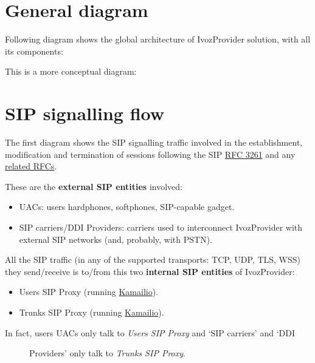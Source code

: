\documentclass[letterpaper,10pt,english]{sphinxmanual}
\begin{document}
\section{General diagram}
\label{basic_concepts/architecture/index:general-diagram}
Following diagram shows the global architecture of IvozProvider solution,
with all its components:

\noindent{}

This is a more conceptual diagram:

\noindent{}


\section{SIP signalling flow}
\label{basic_concepts/architecture/index:sip-signalling-flow}\label{basic_concepts/architecture/index:signallingflow}
The first diagram shows the SIP signalling traffic involved in the
establishment, modification and termination of sessions following the SIP
\href{https://tools.ietf.org/html/rfc3261}{RFC 3261} and any \href{https://www.packetizer.com/ipmc/sip/standards.html}{related RFCs}.

These are the \textbf{external SIP entities} involved:
\begin{itemize}
\item {} 
UACs: users hardphones, softphones, SIP-capable gadget.

\item {} 
SIP carriers/DDI Providers: carriers used to interconnect IvozProvider with external SIP
networks (and, probably, with PSTN).

\end{itemize}

All the SIP traffic (in any of the supported transports: TCP, UDP, TLS, WSS)
they send/receive is to/from this two \textbf{internal SIP entities} of IvozProvider:
\begin{itemize}
\item {} 
Users SIP Proxy (running \href{https://www.kamailio.org}{Kamailio}).

\item {} 
Trunks SIP Proxy (running \href{https://www.kamailio.org}{Kamailio}).

\end{itemize}
\begin{description}
\item[{In fact, users UACs only talk to \emph{Users SIP Proxy} and `SIP carriers' and `DDI}] \leavevmode
Providers' only talk to \emph{Trunks SIP Proxy}.

\end{description}
\end{document}
